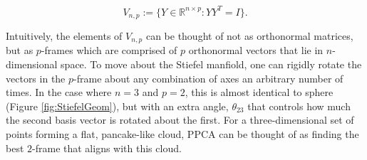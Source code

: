 \documentclass{article}
\begin{document}
\begin{equation}
V_{n,p} := \{Y \in \mathbb{R}^{n \times p}: YY^T = I \}.
\end{equation}

Intuitively, the elements of $V_{n,p}$ can be thought of not as orthonormal matrices, but as $p$-frames which are comprised of $p$ orthonormal vectors that lie in $n$-dimensional space. To move about the Stiefel manfiold, one can rigidly rotate the vectors in the $p$-frame about any combination of axes an arbitrary number of times. In the case where $n = 3$ and $p = 2$, this is almost identical to sphere (Figure \ref{fig:StiefelGeom}), but with an extra angle, $\theta_{23}$ that controls how much the second basis vector is rotated about the first. For a three-dimensional set of points forming a flat, pancake-like cloud, PPCA can be thought of as finding the best $2$-frame that aligns with this cloud.
\end{document}
